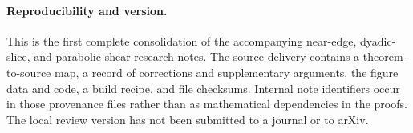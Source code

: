 \paragraph{Reproducibility and version.}
This is the first complete consolidation of the accompanying
near-edge, dyadic-slice, and parabolic-shear research notes. The source
delivery contains a theorem-to-source map, a record of corrections
and supplementary arguments, the figure data and code, a build
recipe, and file checksums. Internal note identifiers occur in those
provenance files rather than as mathematical dependencies in the
proofs. The local review version has not been submitted to a journal
or to arXiv.
